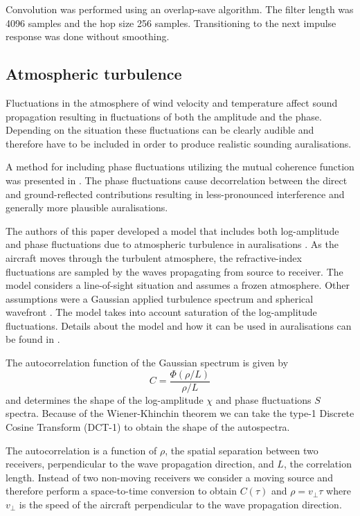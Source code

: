 \documentclass[10pt,twocolumn]{article}
\begin{document}
Convolution was performed using an overlap-save algorithm. The filter length was
4096 samples and the hop size 256 samples. Transitioning to the next impulse
response was done without smoothing.

\subsection{Atmospheric turbulence}
Fluctuations in the atmosphere of wind velocity and temperature affect sound
propagation resulting in fluctuations of both the amplitude and the phase.
Depending on the situation these fluctuations can be clearly audible and
therefore have to be included in order to produce realistic sounding
auralisations.

A method for including phase fluctuations utilizing the mutual
coherence function was presented in \cite{Arntzen2014a, Arntzen2014b, Shin2006}.
The phase fluctuations cause decorrelation between the direct and
ground-reflected contributions resulting in less-pronounced interference
and generally more plausible auralisations.

The authors of this paper developed a model that includes both log-amplitude and phase fluctuations due to
atmospheric turbulence in auralisations \cite{Rietdijk2014, Rietdijk2014a,
Rietdijk2017}. As the aircraft moves through the turbulent atmosphere, the
refractive-index fluctuations are sampled by the waves propagating from source
to receiver. The model considers a line-of-sight situation and assumes a frozen
atmosphere. Other assumptions were a Gaussian applied turbulence spectrum and
spherical wavefront \cite{Wilson1999,Daigle1983}. The model takes into account
saturation of the log-amplitude fluctuations. Details about the model and how it
can be used in auralisations can be found in \cite{Rietdijk2017}.

The autocorrelation function of the Gaussian spectrum is given by \cite{Daigle1983}
\begin{equation}
 C = \frac{\Phi\left(\rho/L\right)}{\rho/L}
\end{equation}
and determines the shape of the log-amplitude $\chi$ and phase fluctuations $S$
spectra. Because of the Wiener-Khinchin theorem we can take the type-1 Discrete
Cosine Transform (DCT-1) to obtain the shape of the autospectra.

The autocorrelation is a function of $\rho$, the spatial separation between two receivers,
perpendicular to the wave propagation direction, and $L$, the correlation
length. Instead of two non-moving receivers we consider a moving source
and therefore perform a space-to-time conversion to obtain $C(\tau)$ and $\rho=v_{\bot}\tau$ where
$v_{\bot}$ is the speed of the aircraft perpendicular to the wave propagation
direction.
\end{document}
